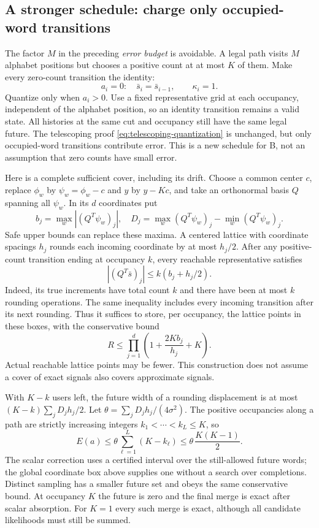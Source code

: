 \documentclass[10pt,a4paper]{article}
\begin{document}
\subsection{A stronger schedule: charge only occupied-word transitions}
\label{sec:occupied-quantization}
The factor $M$ in the preceding \emph{error budget} is avoidable. A legal path visits $M$ alphabet positions
but chooses a positive count at at most $K$ of them. Make every zero-count transition the identity:
\[
 a_i=0:\quad \bar s_i=\bar s_{i-1},\qquad \kappa_i=1.
\]
Quantize only when $a_i>0$. Use a fixed representative grid at each occupancy, independent of the alphabet
position, so an identity transition remains a valid state. All histories at the same cut and occupancy still
have the same legal future. The telescoping proof \eqref{eq:telescoping-quantization} is unchanged, but only
occupied-word transitions contribute error. This is a new schedule for B, not an assumption that zero counts
have small error.

Here is a complete sufficient cover, including its drift. Choose a common center $c$, replace $\phi_w$ by
$\psi_w=\phi_w-c$ and $y$ by $y-Kc$, and take an orthonormal basis $Q$ spanning all $\psi_w$. In its $d$
coordinates put
\[
 b_j=\max_w|(Q^T\psi_w)_j|,\quad
 D_j=\max_w(Q^T\psi_w)_j-\min_w(Q^T\psi_w)_j.
\]
Safe upper bounds can replace these maxima. A centered lattice with coordinate spacings $h_j$ rounds
each incoming coordinate by at most $h_j/2$. After any positive-count transition ending at occupancy $k$,
every reachable representative satisfies
\[
 |(Q^T\bar s)_j|\leq k(b_j+h_j/2).
\]
Indeed, its true increments have total count $k$ and there have been at most $k$ rounding operations.
The same inequality includes every incoming transition after its next rounding. Thus it suffices to store,
per occupancy, the lattice points in these boxes, with the conservative bound
\begin{equation}
 R\leq\prod_{j=1}^d\left(1+\frac{2Kb_j}{h_j}+K\right).
 \label{eq:occupied-cover}
\end{equation}
Actual reachable lattice points may be fewer. This construction does not assume a cover of exact signals
also covers approximate signals.

With $K-k$ users left, the future width of a rounding displacement is at most
$(K-k)\sum_jD_jh_j/2$. Let $\theta=\sum_jD_jh_j/(4\sigma^2)$. The positive occupancies along a path are
strictly increasing integers $k_1<\cdots<k_L\leq K$, so
\begin{equation}
 E(a)\leq\theta\sum_{\ell=1}^L(K-k_\ell)
 \leq\theta\,\frac{K(K-1)}2.
 \label{eq:occupied-error}
\end{equation}
The scalar correction uses a certified interval over the still-allowed future words; the global coordinate
box above supplies one without a search over completions. Distinct sampling has a smaller future set and
obeys the same conservative bound. At occupancy $K$ the future is zero and the final merge is exact after
scalar absorption. For $K=1$ every such merge is exact, although all candidate likelihoods must still be summed.
\end{document}
